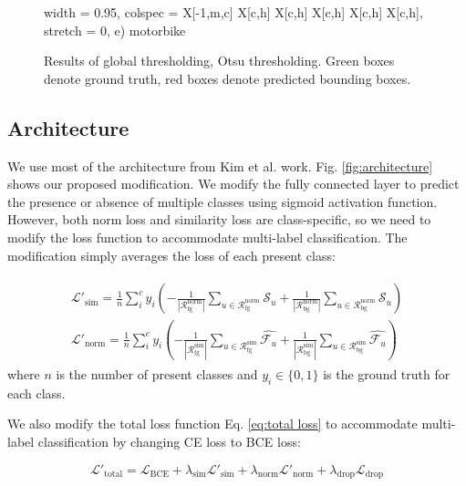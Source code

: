 \documentclass[conference]{IEEEtran}
\begin{document}
\begin{figure}
\begin{tblr}{
            width = 0.95\textwidth,
            colspec = {X[-1,m,c] X[c,h] X[c,h] X[c,h] X[c,h] X[c,h]},
            stretch = 0,
        }
e) motorbike \\
    \end{tblr}
    \caption{Results of global thresholding, Otsu thresholding. Green boxes denote ground truth, red boxes denote predicted bounding boxes.}
    \label{fig:img result}
\end{figure}

\subsection{Architecture}
We use most of the architecture from Kim et al. \cite{kim2022bridging} work. Fig. \ref{fig:architecture} shows our proposed modification. We modify the fully connected layer to predict the presence or absence of multiple classes using sigmoid activation function. However, both norm loss and similarity loss are class-specific, so we need to modify the loss function to accommodate multi-label classification. The modification simply averages the loss of each present class:

\begin{gather} \label{eq:modified loss}
    \begin{align}
        \mathcal{L}'_{\text{sim}} = \frac{1}{n}\sum_{i}^{c}y_i (-\frac{1}{|\mathcal{R}_{\text{fg}}^{\text{norm}}|} \sum_{u\in\mathcal{R}_{\text{fg}}^{\text{norm}}}{\mathcal{S}_u} + \frac{1}{|\mathcal{R}_{\text{bg}}^{\text{norm}}|} \sum_{u\in\mathcal{R}_{\text{bg}}^{\text{norm}}}{\mathcal{S}_u}) \\
        \mathcal{L}'_{\text{norm}} = \frac{1}{n}\sum_{i}^{c}y_i (-\frac{1}{|\mathcal{R}_{\text{fg}}^{\text{sim}}|}\sum_{u\in\mathcal{R}_{\text{fg}}^{\text{sim}}}{\hat{\mathcal{F}_u}} + \frac{1}{|\mathcal{R}_{\text{bg}}^{\text{sim}}|}\sum_{u\in\mathcal{R}_{\text{bg}}^{\text{sim}}}{\hat{\mathcal{F}_u}})
    \end{align}
\end{gather}
where $n$ is the number of present classes and $y_i \in \{0, 1\}$ is the ground truth for each class.

We also modify the total loss function Eq. \ref{eq:total loss} to accommodate multi-label classification by changing CE loss to BCE loss:

\begin{equation}
    \mathcal{L}'_{\text{total}} = \mathcal{L}_{\text{BCE}} + \lambda_{\text{sim}}\mathcal{L}'_{\text{sim}} + \lambda_{\text{norm}}\mathcal{L}'_{\text{norm}} + \lambda_{\text{drop}}\mathcal{L}_{\text{drop}}
\end{equation}
\end{document}
